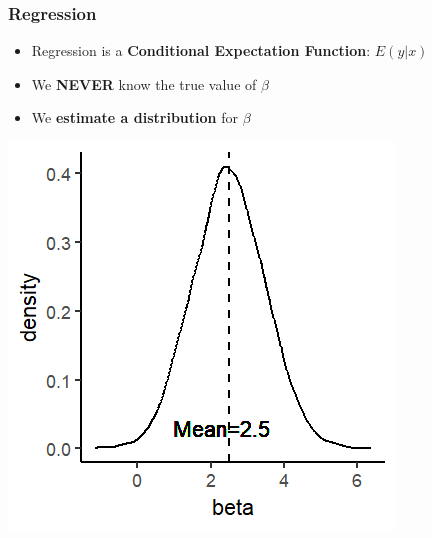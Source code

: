 \documentclass[xcolor=x11names,compress]{beamer}\usepackage[]{graphicx}\usepackage[]{color}
\makeatletter
\def\maxwidth{ %
  \ifdim\Gin@nat@width>\linewidth
    \linewidth
  \else
    \Gin@nat@width
  \fi
}
\newenvironment{knitrout}{}{} %
\renewcommand{\(}{\begin{columns}}
\renewcommand{\)}{\end{columns}}
\newcommand{\<}[1]{\begin{column}{#1}}
\renewcommand{\>}{\end{column}}
\makeatother
\begin{document}
\begin{frame}
\frametitle{Regression}
\begin{itemize}
\item Regression is a \textbf{Conditional Expectation Function}: $E(y|x)$
\item We \textbf{NEVER} know the true value of $\beta$
\item We \textbf{estimate a distribution} for $\beta$
\end{itemize}
\begin{knitrout}
\color{fgcolor}
\includegraphics[width=\maxwidth]{figure/beta_dist2-1} 

\end{knitrout}
\end{frame}
\end{document}

